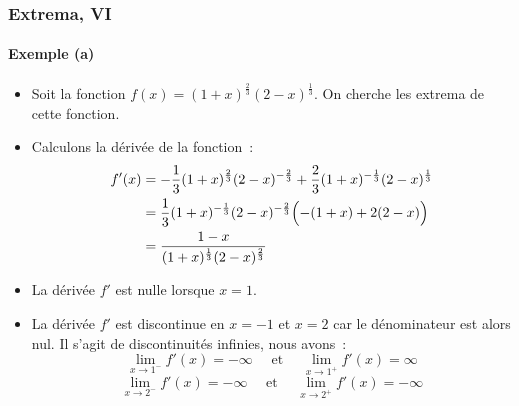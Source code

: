 \documentclass[10pt,notheorems]{beamer}
\theoremstyle{plain}
\theoremstyle{definition} %
\begin{document}
\begin{frame}
  \frametitle{Extrema, VI}
  \framesubtitle{Exemple (a)}

  \medskip

  \begin{itemize}

  \item Soit la fonction $f(x) = (1+x)^{\frac{2}{3}}(2-x)^{\frac{1}{3}}$. On cherche les extrema de cette fonction.\newline

  \item Calculons la dérivée de la fonction~:
    \[
      \begin{split}
        f'(x) &= -\frac{1}{3}(1+x)^{\frac{2}{3}}(2-x)^{-\frac{2}{3}}+\frac{2}{3}(1+x)^{-\frac{1}{3}}(2-x)^{\frac{1}{3}}\\
        &= \frac{1}{3}(1+x)^{-\frac{1}{3}}(2-x)^{-\frac{2}{3}}\Bigl(-(1+x)+2(2-x)\Bigr)\\
        &=\frac{1-x}{(1+x)^{\frac{1}{3}}(2-x)^{\frac{2}{3}}}
      \end{split}
    \]

    \bigskip

  \item La dérivée $f'$ est nulle lorsque $x=1$.\newline

  \item La dérivée $f'$ est discontinue en $x=-1$ et $x=2$ car le dénominateur est alors nul. Il s'agit de discontinuités infinies, nous avons~:
    \[
      \lim_{x\rightarrow 1^-}f'(x) = -\infty \quad \text{ et } \quad \lim_{x\rightarrow 1^+}f'(x) = \infty
    \]
    \[
      \lim_{x\rightarrow 2^-}f'(x) = -\infty \quad \text{ et } \quad \lim_{x\rightarrow 2^+}f'(x) = -\infty
    \]

  \end{itemize}

\end{frame}
\end{document}
